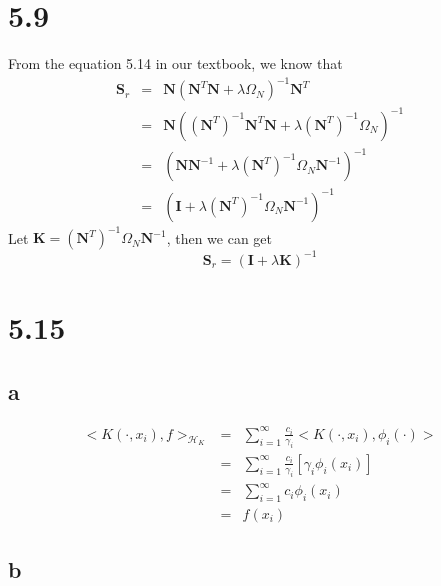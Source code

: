 \documentclass[11pt, oneside]{article}   	%
\begin{document}
\maketitle
\section{5.9}
From the equation 5.14 in our textbook, we know that 
\begin{eqnarray}
\mathbf{S}_r &=& \mathbf{N} (\mathbf{N}^T\mathbf{N} + \lambda \Omega_N)^{-1}\mathbf{N}^{T} \\
&=& \mathbf{N} ((\mathbf{N}^{T} )^{-1} \mathbf{N}^T\mathbf{N}+ \lambda (\mathbf{N}^{T} )^{-1} \Omega_N)^{-1}\\
&=&   (\mathbf{N} \mathbf{N} ^{-1}+ \lambda (\mathbf{N}^{T} )^{-1} \Omega_N\mathbf{N} ^{-1})^{-1}\\
&=&   (\mathbf{I} + \lambda (\mathbf{N}^{T} )^{-1} \Omega_N\mathbf{N} ^{-1})^{-1}
\end{eqnarray}
Let $\mathbf{K} = (\mathbf{N}^{T} )^{-1} \Omega_N\mathbf{N} ^{-1}$, then we can get
\begin{equation}
\mathbf{S}_r = (\mathbf{I} + \lambda \mathbf{K} )^{-1}
\end{equation}

\section{5.15}
\subsection{a}

\begin{eqnarray}
<K(\cdot, x_i), f>_{\mathcal{H}_K} &=& \sum_{i=1}^{\infty} \frac{c_i}{\gamma_i} <K(\cdot, x_i), \phi_i(\cdot)>\\
&=& \sum_{i=1}^{\infty} \frac{c_i}{\gamma_i} [\gamma_i\phi_i(x_i)]\\
&=& \sum_{i=1}^{\infty} c_i \phi_i(x_i) \\
&=& f(x_i)
\end{eqnarray}

\subsection{b}
\end{document}
